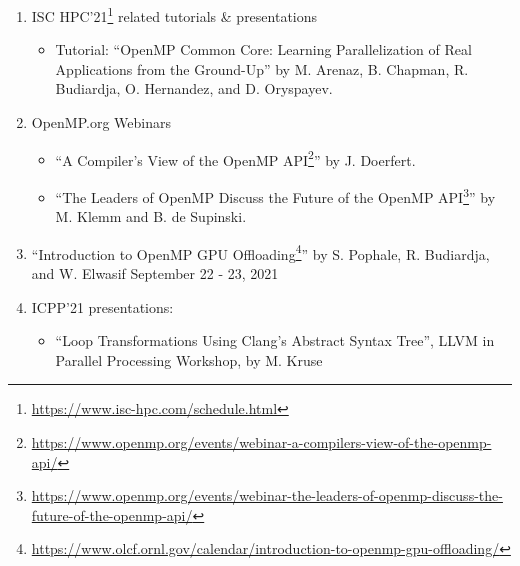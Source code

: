 \begin{enumerate}
\item ISC HPC'21\footnote{\url{https://www.isc-hpc.com/schedule.html}} related tutorials \& presentations
\begin{itemize}
    \item Tutorial: \enquote{OpenMP Common Core: Learning Parallelization of Real Applications from the Ground-Up} by M. Arenaz, B. Chapman, R. Budiardja, O. Hernandez, and D. Oryspayev.
\end{itemize}

\item OpenMP.org Webinars 
\begin{itemize}
    \item \enquote{A Compiler's View of the OpenMP API\footnote{\url{https://www.openmp.org/events/webinar-a-compilers-view-of-the-openmp-api/}}} by J. Doerfert.
    \item \enquote{The Leaders of OpenMP Discuss the Future of the OpenMP API\footnote{\url{https://www.openmp.org/events/webinar-the-leaders-of-openmp-discuss-the-future-of-the-openmp-api/}}} by M. Klemm and B. de Supinski.
\end{itemize}

\item \enquote{Introduction to OpenMP GPU Offloading\footnote{\url{https://www.olcf.ornl.gov/calendar/introduction-to-openmp-gpu-offloading/}}} by  S. Pophale, R. Budiardja, and W. Elwasif September 22 - 23, 2021
   
\item ICPP'21 presentations:
\begin{itemize}
    \item \enquote{Loop Transformations Using Clang’s Abstract Syntax Tree}, LLVM in Parallel Processing Workshop, by M. Kruse
\end{itemize}
      

\end{enumerate}
